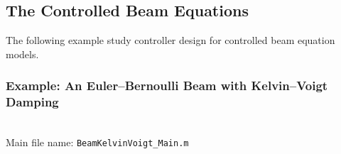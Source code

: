 \documentclass[11pt, a4paper]{amsart}
\newcommand{\COMMapproxRC}[1]{{\color{gray}#1}}
\renewcommand{\COMMapproxRC}[1]{}
\theoremstyle{definition}
\numberwithin{equation}{section}
\begin{document}
%
%

\subsection{The Controlled Beam Equations}
\label{sec:ControlledBeams}


The following example study controller design for controlled beam equation models.


\medskip

\subsubsection*{Example: An Euler--Bernoulli Beam with Kelvin--Voigt Damping}
\label{sec:BeamKV}
~\\[-1ex]

\noindent Main file name: \texttt{BeamKelvinVoigt\_Main.m}

\medskip
\end{document}
